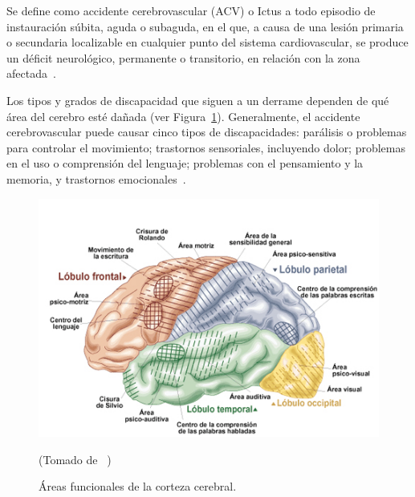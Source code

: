 
Se define como accidente cerebrovascular (ACV) o Ictus a todo episodio de instauración súbita, aguda o subaguda, en el que, a causa de una lesión primaria o secundaria localizable en cualquier punto del sistema cardiovascular, se produce un déficit neurológico, permanente o transitorio, en relación con la zona afectada~\cite{ictus}.

Los tipos y grados de discapacidad que siguen a un derrame dependen de qué área del cerebro esté dañada (ver Figura~\ref{fig: cerebralcortex}). Generalmente, el accidente cerebrovascular puede causar cinco tipos de discapacidades: parálisis o problemas para controlar el movimiento; trastornos sensoriales, incluyendo dolor; problemas en el uso o comprensión del lenguaje; problemas con el pensamiento y la memoria, y trastornos emocionales~\cite{post-strok}. 

\begin{figure}[ht]
    \centering
    \includegraphics[scale=0.5]{images/brain.jpg}
    \caption{Áreas funcionales de la corteza cerebral.}
    (Tomado de ~\cite{areacereabral})
    \label{fig: cerebralcortex}
\end{figure}

